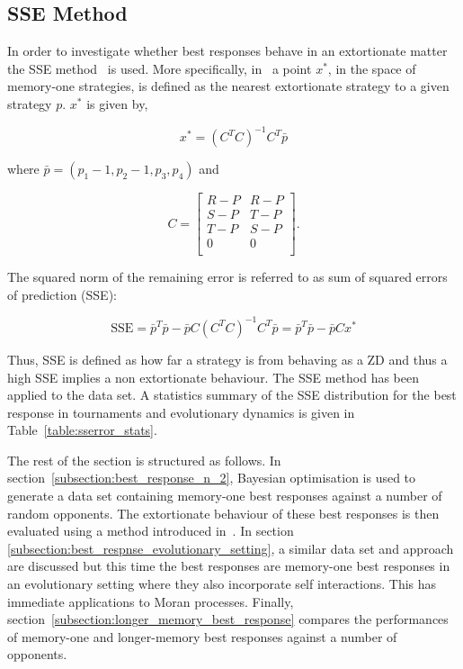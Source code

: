 \subsection{SSE Method}

In order to investigate whether best responses
behave in an extortionate matter the SSE method~\cite{Knight2019} is used. More
specifically,
in~\cite{Knight2019} a point \(x^*\), in the space of memory-one strategies, is
defined as the nearest extortionate strategy to a given strategy \(p\). \(x^*\) is
given by,

\begin{equation}\label{eqn:x_star_formula}
    x^* = {\left(C^{T}C\right)}^{-1}C^{T}\bar{p}
\end{equation}

where \(\bar{p}=(p_1 - 1, p_2 - 1, p_3, p_4)\) and

\begin{equation}\label{eq:definition_of_C}
    C =
    \begin{bmatrix}
        R - P & R- P \\
        S - P & T- P \\
        T - P & S- P \\
        0     & 0 \\
    \end{bmatrix}.
\end{equation}

The squared norm of the remaining error is referred to as sum of squared errors
of prediction (SSE):

\begin{equation}\label{eqn:x_SSError_formula}
    \text{SSE} = {\bar{p}} ^ T \bar{p} -
           \bar{p} C \left(C ^ T C \right) ^ {-1} C ^ T \bar{p}
         = {\bar{p}} ^ T \bar{p} - \bar{p} C x ^ *
\end{equation}

Thus, SSE is defined as how far a strategy is from behaving as a ZD and thus a
high SSE implies a non extortionate behaviour. The SSE method has been applied
to the data set. A statistics summary of the SSE distribution for the best
response in tournaments and evolutionary dynamics is given in
Table~\ref{table:sserror_stats}.

The rest of the section is structured as follows. In
section~\ref{subsection:best_response_n_2}, Bayesian optimisation is used to
generate a data set containing memory-one best responses against a number of
random opponents. The extortionate behaviour of these best responses is then
evaluated using a method introduced in~\cite{Knight2019}. In section
\ref{subsection:best_respnse_evolutionary_setting}, a similar data set and
approach are discussed but this time the best responses are memory-one best
responses in an evolutionary setting where they also incorporate self
interactions. This has immediate applications to Moran processes.
Finally, section~\ref{subsection:longer_memory_best_response}
compares the performances of memory-one and longer-memory best responses against
a number of opponents.

